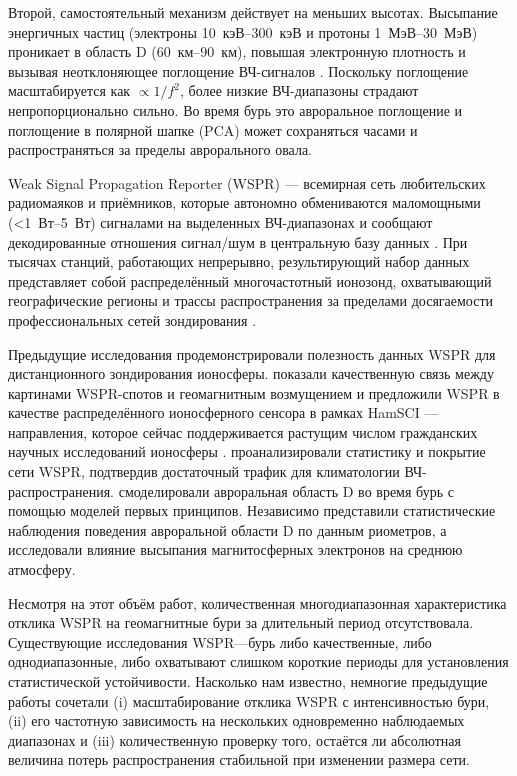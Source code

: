 \documentclass{agujournal2019}
\begin{document}
Второй, самостоятельный механизм действует на меньших высотах. Высыпание энергичных
частиц (электроны \SIrange{10}{300}{\mbox{кэВ}} и протоны \SIrange{1}{30}{\mbox{МэВ}})
проникает в область D (\SIrange{60}{90}{\mbox{км}}), повышая электронную плотность
и вызывая неотклоняющее поглощение ВЧ-сигналов
\citep{hargreaves1969,reid1974}. Поскольку поглощение масштабируется как
$\propto 1/f^2$, более низкие ВЧ-диапазоны страдают непропорционально
сильно. Во время бурь это авроральное поглощение и поглощение в полярной
шапке (PCA) может сохраняться часами и распространяться за пределы
аврорального овала.

Weak Signal Propagation Reporter (WSPR) — всемирная сеть любительских
радиомаяков и приёмников, которые автономно обмениваются маломощными
(\SI{<1}{\mbox{Вт}}--\SI{5}{\mbox{Вт}}) сигналами на выделенных ВЧ-диапазонах и сообщают
декодированные отношения сигнал/шум в центральную базу данных
\citep{taylor2010}. При тысячах станций, работающих непрерывно, результирующий
набор данных представляет собой распределённый многочастотный ионозонд,
охватывающий географические регионы и трассы распространения за пределами
досягаемости профессиональных сетей зондирования
\citep{frissell2016,labelle2023}.

Предыдущие исследования продемонстрировали полезность данных WSPR для
дистанционного зондирования ионосферы. \citet{frissell2016} показали
качественную связь между картинами WSPR-спотов и геомагнитным возмущением
и предложили WSPR в качестве распределённого ионосферного сенсора в рамках
HamSCI — направления, которое сейчас поддерживается растущим числом
гражданских научных исследований ионосферы
\citep{hamsci2023,cerwin2026,potter2026}. \citet{labelle2023}
проанализировали статистику и покрытие сети WSPR, подтвердив достаточный
трафик для климатологии ВЧ-распространения. \citet{themens2021}
смоделировали авроральная область D во время бурь с помощью моделей первых
принципов. Независимо \citet{kavanagh2004} представили статистические
наблюдения поведения авроральной области D по данным риометров, а
\citet{rodger2010} исследовали влияние высыпания магнитосферных электронов
на среднюю атмосферу.

Несмотря на этот объём работ, количественная многодиапазонная характеристика
отклика WSPR на геомагнитные бури за длительный период отсутствовала.
Существующие исследования WSPR—бурь либо качественные, либо однодиапазонные,
либо охватывают слишком короткие периоды для установления статистической
устойчивости. Насколько нам известно, немногие предыдущие работы сочетали
(i) масштабирование отклика WSPR с интенсивностью бури, (ii) его частотную
зависимость на нескольких одновременно наблюдаемых диапазонах и (iii)
количественную проверку того, остаётся ли абсолютная величина потерь
распространения стабильной при изменении размера сети.
\end{document}
